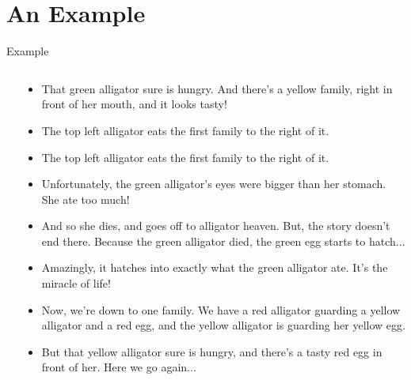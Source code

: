 \documentclass[usenames,dvipsnames]{beamer}
\newcommand{\pic}[2]{\texttt{[image: \#2]}}
\begin{document}
\section{An Example}
\begin{frame}{Example}
  \begin{columns}
    \begin{column}{0.4\textwidth}
    \end{column}
    \begin{column}{0.6\textwidth}
      \begin{itemize}
      \item<1|only@1>
        That green alligator sure is hungry. And there's a yellow family, right
        in front of her mouth, and it looks tasty!      

      \item<2|only@2>
        The top left alligator eats the first family to the right of it.

      \item<3|only@3>
        The top left alligator eats the first family to the right of it.

      \item<4|only@4>
        Unfortunately, the green alligator's eyes were bigger than her stomach.
        She ate too much!

      \item<5|only@5>
        And so she dies, and goes off to alligator heaven. But, the story
        doesn't end there. Because the green alligator died, the green egg
        starts to hatch...

      \item<6|only@6>
        Amazingly, it hatches into exactly what the green alligator ate.
        It's the miracle of life!

      \item<6|only@6>
        Now, we're down to one family. We have a red alligator guarding a yellow
        alligator and a red egg, and the yellow alligator is guarding her yellow egg.

      \item<7|only@7>
        But that yellow alligator sure is hungry, and there's a tasty red egg in
        front of her. Here we go again...


\end{itemize}
\end{column}
\end{columns}
\end{frame}
\end{document}
